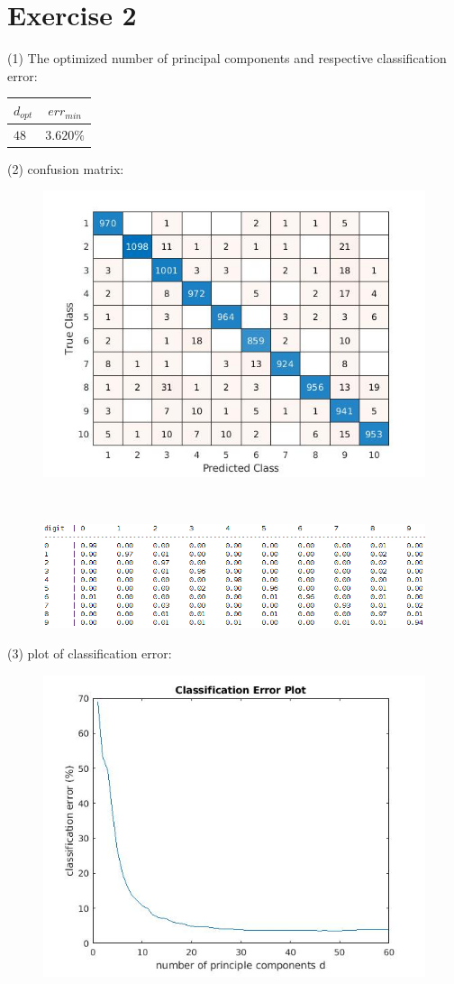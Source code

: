 \documentclass{article}
\begin{document}
\section*{Exercise 2}
(1) The optimized number of principal components and respective classification error:
\begin{center}
	\begin{tabular}{ l | c }
		\hline
		$d_{opt}$ & $err_{min}$ \\ \hline		
		$48$ & $3.620\%$ \\ \hline
	\end{tabular}
\end{center}
(2) confusion matrix:
\begin{figure}[ht]
	\centering
	\includegraphics[width=0.7\linewidth]{confusionMat.jpg}  
\end{figure}
\\[8pt]
\begin{figure}[ht]
	\centering
	\includegraphics[width=1\linewidth]{helper.png}  
\end{figure}
\newpage
(3) plot of classification error:
\begin{figure}[ht]
	\centering
	\includegraphics[width=0.8\linewidth]{error.jpg}  
\end{figure}
\\[200pt]
\end{document}
